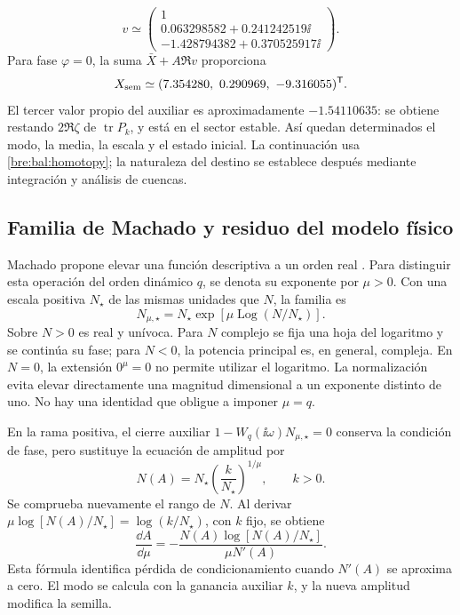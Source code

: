 \begin{equation}
 v\simeq\begin{pmatrix}
 1\\0.063298582+0.241242519\ii\\
 -1.428794382+0.370525917\ii
 \end{pmatrix}.
 \label{bre:bal:example-mode}
\end{equation}
Para fase \(\varphi=0\), la suma \(\bar X+A\Re v\) proporciona
\begin{equation}
 X_{\mathrm{sem}}\simeq
 (7.354280,\ 0.290969,\ -9.316055)^{\mathsf T}.
 \label{bre:bal:example-seed}
\end{equation}
El tercer valor propio del auxiliar es aproximadamente
\(-1.54110635\): se obtiene restando \(2\Re\zeta\) de
\(\operatorname{tr}P_k\), y está en el sector estable. Así quedan
determinados el modo, la media, la escala y el estado inicial. La
continuación usa \eqref{bre:bal:homotopy}; la naturaleza del destino se
establece después mediante integración y análisis de cuencas.

\subsection{Familia de Machado y residuo del modelo físico}
\label{bre:bal:machado}

Machado propone elevar una función descriptiva a un orden real
\cite{Machado2015FDF}. Para distinguir esta operación del orden
dinámico \(q\), se denota su exponente por \(\mu>0\). Con una escala
positiva \(N_\star\) de las mismas unidades que \(N\), la familia es
\begin{equation}
 N_{\mu,\star}=N_\star
 \exp\left[\mu\operatorname{Log}(N/N_\star)\right].
 \label{bre:bal:machado-definition}
\end{equation}
Sobre \(N>0\) es real y unívoca. Para \(N\) complejo se fija una
hoja del logaritmo y se continúa su fase; para \(N<0\), la potencia
principal es, en general, compleja. En \(N=0\), la extensión
\(0^\mu=0\) no permite utilizar el logaritmo. La normalización evita
elevar directamente una magnitud dimensional a un exponente distinto
de uno. No hay una identidad que obligue a imponer \(\mu=q\).

En la rama positiva, el cierre auxiliar
\(1-W_q(\ii\omega)N_{\mu,\star}=0\) conserva la condición de
fase, pero sustituye la ecuación de amplitud por
\begin{equation}
 N(A)=N_\star\left(\frac{k}{N_\star}\right)^{1/\mu},
 \qquad k>0.
 \label{bre:bal:machado-amplitude}
\end{equation}
Se comprueba nuevamente el rango de \(N\). Al derivar
\(\mu\log[N(A)/N_\star]=\log(k/N_\star)\), con \(k\) fijo,
se obtiene
\begin{equation}
 \frac{\dd A}{\dd\mu}
 =-\frac{N(A)\log[N(A)/N_\star]}{\mu N'(A)}.
 \label{bre:bal:machado-sensitivity}
\end{equation}
Esta fórmula identifica pérdida de condicionamiento cuando
\(N'(A)\) se aproxima a cero. El modo se calcula con la ganancia
auxiliar \(k\), y la nueva amplitud modifica la semilla.

